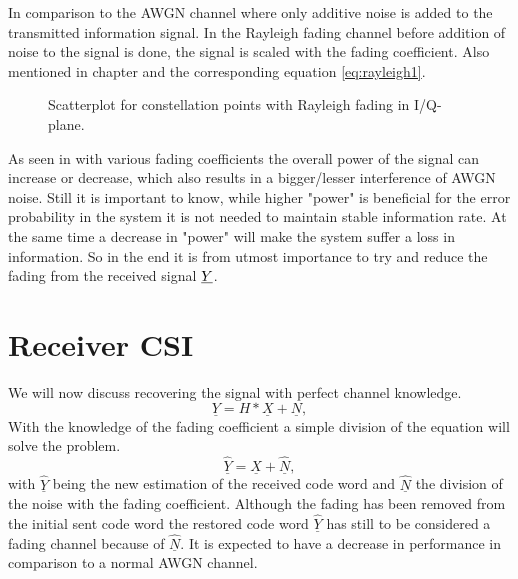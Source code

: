 In comparison to the \gls{AWGN} channel where only additive noise is added to the transmitted information signal. In the Rayleigh fading channel before addition of noise to the signal is done, the signal is scaled with the fading coefficient. Also mentioned in chapter  and the corresponding equation \eqref{eq:rayleigh1}.
\begin{figure}[!htb]
	\setlength{}
	\setlength\fheight{0.4\textheight}
	\centering
		
	\caption{Scatterplot for constellation points with Rayleigh fading in I/Q-plane.}
	\label{fig:scatter}
\end{figure}
As seen in  with various fading coefficients the overall power of the signal can increase or decrease, which also results in a bigger/lesser interference of AWGN noise. Still it is important to know, while higher "power" is beneficial for the error probability in the system it is not needed to maintain stable information rate. At the same time a decrease in "power" will make the system suffer a loss in information. So in the end it is from utmost importance to try and reduce the fading from the received signal $\boldmath\underline{Y}$.
\clearpage
\section{Receiver CSI}
We will now discuss recovering the signal with perfect channel knowledge. 
\begin{equation}
\underline{Y} = H * \underline{X} + \underline{N},
\end{equation}
With the knowledge of the fading coefficient a simple division of the equation will solve the problem.
\begin{equation}
\underline{\hat{Y}} = \underline{X} + \underline{\hat{N}},
\end{equation}
with $\underline{\hat{Y}}$ being the new estimation of the received code word and $\underline{\hat{N}}$ the division of the noise with the fading coefficient.
Although the fading has been removed from the initial sent code word the restored code word \textbf{$\underline{\hat{Y}}$} has still to be considered a fading channel because of $\underline{\hat{N}}$. It is expected to have a decrease in performance in comparison to a normal AWGN channel.

